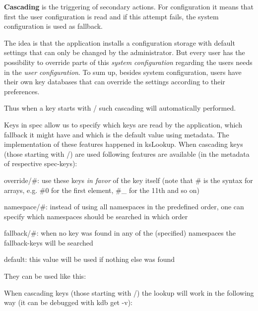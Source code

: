 {\bfseries Cascading} is the triggering of secondary actions. For configuration it means that first the user configuration is read and if this attempt fails, the system configuration is used as fallback.

The idea is that the application installs a configuration storage with default settings that can only be changed by the administrator. But every user has the possibility to override parts of this {\itshape system configuration} regarding the user\textquotesingle{}s needs in the {\itshape user configuration}. To sum up, besides system configuration, users have their own key databases that can override the settings according to their preferences.

Thus when a key starts with {\ttfamily /} such cascading will automatically performed.

Keys in {\ttfamily spec} allow us to specify which keys are read by the application, which fallback it might have and which is the default value using metadata. The implementation of these features happened in {\ttfamily ks\+Lookup}. When cascading keys (those starting with {\ttfamily /}) are used following features are available (in the metadata of respective {\ttfamily spec}-\/keys)\+:


\begin{DoxyItemize}
\item {\ttfamily override/\#}\+: use these keys {\itshape in favor} of the key itself (note that {\ttfamily \#} is the syntax for arrays, e.\+g. {\ttfamily \#0} for the first element, {\ttfamily \#\+\_} for the 11th and so on)
\item {\ttfamily namespace/\#}\+: instead of using all namespaces in the predefined order, one can specify which namespaces should be searched in which order
\item {\ttfamily fallback/\#}\+: when no key was found in any of the (specified) namespaces the {\ttfamily fallback}-\/keys will be searched
\item {\ttfamily default}\+: this value will be used if nothing else was found
\end{DoxyItemize}

They can be used like this\+:




When cascading keys (those starting with {\ttfamily /}) the lookup will work in the following way (it can be debugged with {\ttfamily kdb get -\/v})\+:


